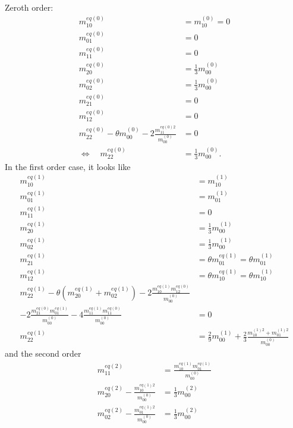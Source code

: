 Zeroth order:
\begin{equation}
  \begin{aligned}
    m_{10}^{eq(0)} & = m_{10}^{(0)} = 0 \\
    m_{01}^{eq(0)} & = 0 \\
    m_{11}^{eq(0)} & = 0 \\
    m_{20}^{eq(0)} & = \frac{1}{3} m_{00}^{(0)} \\
    m_{02}^{eq(0)} & = \frac{1}{3} m_{00}^{(0)} \\
    m_{21}^{eq(0)} & = 0 \\
    m_{12}^{eq(0)} & = 0 \\
    m_{22}^{eq(0)} - \theta m_{00}^{(0)} - 2\frac{ m_{11}^{eq(0)2}}{m_{00}^{(0)}} & = 0 \\
    \Leftrightarrow\quad m_{22}^{eq(0)} &= \frac{1}{3} m_{00}^{(0)}.
  \end{aligned}
\end{equation}
In the first order case, it looks like
\begin{equation}
  \begin{aligned}
    m_{10}^{eq(1)} & = m_{10}^{(1)} \\
    m_{01}^{eq(1)} & = m_{01}^{(1)} \\
    m_{11}^{eq(1)} & = 0 \\
    m_{20}^{eq(1)} & = \frac{1}{3} m_{00}^{(1)} \\
    m_{02}^{eq(1)} & = \frac{1}{3} m_{00}^{(1)} \\
    m_{21}^{eq(1)} & = \theta m_{01}^{eq(1)} = \theta m_{01}^{(1)}\\
    m_{12}^{eq(1)} & = \theta m_{10}^{eq(1)} = \theta m_{10}^{(1)} \\
    m_{22}^{eq(1)} - \theta (m_{20}^{eq(1)} + m_{02}^{eq(1)})
    - 2\frac{ m_{10}^{eq(1)} m_{12}^{eq(0)} }{m_{00}^{(0)}}&\\
    - 2\frac{ m_{21}^{eq(0)} m_{01}^{eq(1)} }{m_{00}^{(0)}}
    - 4\frac{ m_{11}^{eq(1)} m_{11}^{eq(0)} }{m_{00}^{(0)}}&=0\\
    m_{22}^{eq(1)} &= \frac{2}{9} m_{00}^{(1)}
    + \frac{2}{3}\frac{  m_{10}^{(1)2} +m_{01}^{(1)2} }{m_{00}^{(0)}}
  \end{aligned}
\end{equation}
and the second order
\begin{equation}
  \begin{aligned}
    m_{11}^{eq(2)} & = \frac{ m_{10}^{eq(1)}m_{01}^{eq(1)}}{m_{00}^{(0)}} \\
    m_{20}^{eq(2)} - \frac{ m_{10}^{eq(1)2}}{m_{00}^{(0)}} & = \frac{1}{3} m_{00}^{(2)} \\
    m_{02}^{eq(2)} - \frac{ m_{01}^{eq(1)2}}{m_{00}^{(0)}} & = \frac{1}{3} m_{00}^{(2)}
  \end{aligned}
\end{equation}
